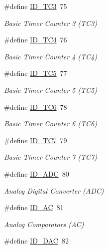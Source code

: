 \begin{DoxyCompactItemize}
\#define \mbox{\hyperlink{group___s_a_m_d21_g17_a_u__id_gac978ebe37e0ce9dfe2eec2f15ab83015}{I\+D\+\_\+\+T\+C3}}~75
\begin{DoxyCompactList}\small\item\em Basic Timer Counter 3 (T\+C3) \end{DoxyCompactList}\item 
\#define \mbox{\hyperlink{group___s_a_m_d21_g17_a_u__id_ga59ecaec462139ce30c8ebe1dc25f9f7d}{I\+D\+\_\+\+T\+C4}}~76
\begin{DoxyCompactList}\small\item\em Basic Timer Counter 4 (T\+C4) \end{DoxyCompactList}\item 
\#define \mbox{\hyperlink{group___s_a_m_d21_g17_a_u__id_ga60408f0e4285fc6e0e837aad86b862f8}{I\+D\+\_\+\+T\+C5}}~77
\begin{DoxyCompactList}\small\item\em Basic Timer Counter 5 (T\+C5) \end{DoxyCompactList}\item 
\#define \mbox{\hyperlink{group___s_a_m_d21_g17_a_u__id_gac63b3ed5c54573b3c93943a3e2b33a3a}{I\+D\+\_\+\+T\+C6}}~78
\begin{DoxyCompactList}\small\item\em Basic Timer Counter 6 (T\+C6) \end{DoxyCompactList}\item 
\#define \mbox{\hyperlink{group___s_a_m_d21_g17_a_u__id_ga2e026ba57161127b95e270fa8d6ea327}{I\+D\+\_\+\+T\+C7}}~79
\begin{DoxyCompactList}\small\item\em Basic Timer Counter 7 (T\+C7) \end{DoxyCompactList}\item 
\#define \mbox{\hyperlink{group___s_a_m_d21_g17_a_u__id_gafb7efa537d1d64419483b97f642009fd}{I\+D\+\_\+\+A\+DC}}~80
\begin{DoxyCompactList}\small\item\em Analog Digital Converter (A\+DC) \end{DoxyCompactList}\item 
\#define \mbox{\hyperlink{group___s_a_m_d21_g17_a_u__id_ga20fe08f8d0b2a4e6c0dbb2371aacadb0}{I\+D\+\_\+\+AC}}~81
\begin{DoxyCompactList}\small\item\em Analog Comparators (AC) \end{DoxyCompactList}\item 
\#define \mbox{\hyperlink{group___s_a_m_d21_g17_a_u__id_ga2561118247335c13b56f7a79a17fceff}{I\+D\+\_\+\+D\+AC}}~82

\end{DoxyCompactItemize}
